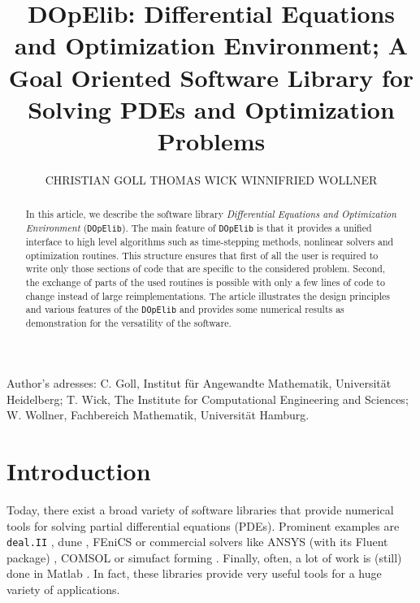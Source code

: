 \documentclass[prodmode,acmtoms]{acmsmall}
\numberwithin{equation}{section}
\newcommand{\deal}{\texttt{deal.II}}
\newcommand{\dope}{\texttt{DOpElib}}
\begin{document}

\title{DOpElib: Differential Equations and Optimization Environment; A Goal Oriented Software Library for Solving PDEs and Optimization Problems}

\author{CHRISTIAN GOLL
THOMAS WICK
WINNIFRIED WOLLNER
}


\begin{abstract}
In this article, we describe the software library 
\textit{Differential Equations and Optimization Environment} (\dope{}).
The main feature of \dope{} is that it provides a unified interface to high level algorithms 
such as time-stepping methods, nonlinear solvers and optimization routines. This structure ensures 
that first of all the user is required to write only those sections of code that are specific to 
the considered problem. Second, the exchange of parts of the used routines is possible 
with only a few lines of code to change instead of large reimplementations.
The article illustrates the design principles and various features
of the \dope{} and provides some 
numerical results as demonstration for the versatility of the software.
\end{abstract}

\begin{bottomstuff}
Author's adresses: C. Goll, Institut f\"ur Angewandte Mathematik,
Universit\"at Heidelberg;
T. Wick, The Institute for Computational Engineering and Sciences;
W. Wollner, Fachbereich Mathematik, Universit\"at Hamburg.
\end{bottomstuff}
                      

\maketitle


\section{Introduction}
\label{introduction}
Today, there exist a broad variety of software libraries
that provide numerical tools for solving partial differential
equations (PDEs). Prominent examples are 
\deal{} \cite{dealnew}, dune \cite{dune}, 
FEniCS \cite{fenics}
or commercial solvers like ANSYS (with its Fluent package) \cite{ansys},
COMSOL \cite{comsol} or simufact forming \cite{simufact}.
Finally, often, a lot of work is (still) done in Matlab \cite{matlab}.
In fact, these libraries provide very useful tools 
for a huge variety of applications. 
\end{document}
